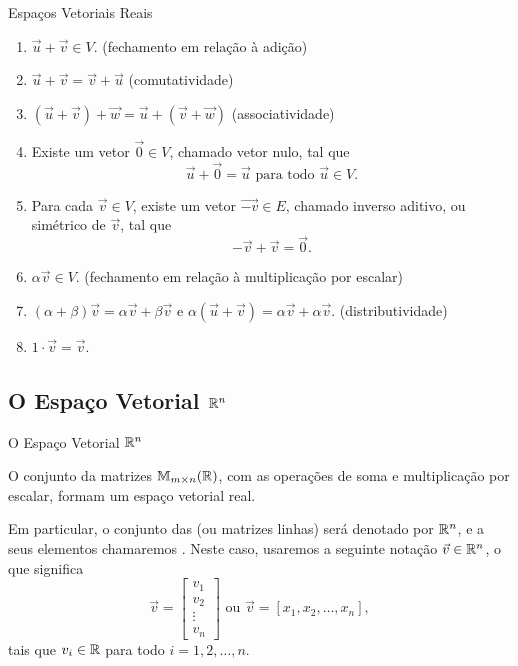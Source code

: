 \begin{frame}[label=vetores]{Espaços Vetoriais Reais}

\begin{enumerate}

\item $\vec{u}+\vec{v}\in V$. (fechamento em relação à adição)
\item $\vec{u}+\vec{v}=\vec{v}+\vec{u}$ (comutatividade)
\item $(\vec{u}+\vec{v})+\vec{w}=\vec{u}+(\vec{v}+\vec{w})$ (associatividade)
\item Existe um vetor $\vec{0}\in V$, chamado {\color{blue}vetor nulo}, tal que
\[\vec{u}+\vec{0}=\vec{u} \text{ para todo } \vec{u}\in V.\]

\item Para cada $\vec{v}\in V$, existe um vetor $\vec{-v}\in E$, chamado {\color{blue}inverso aditivo}, ou {\color{blue}simétrico} de $\vec{v}$, tal que
\[-\vec{v}+\vec{v}=\vec{0}.\]

\item $\alpha \vec{v}\in V$. (fechamento em relação à multiplicação por escalar)

\item $(\alpha+\beta)\vec{v}=\alpha \vec{v}+\beta \vec{v}$ e $\alpha(\vec{u}+\vec{v})=\alpha\vec{v}+\alpha\vec{v}$. (distributividade)

\item $1\cdot \vec{v}=\vec{v}$.
\end{enumerate}
\end{frame}



\subsection*{O Espaço Vetorial \(\mathbb{R}^n\)} \label{evreal}
\begin{frame}[label=vetores]{O Espaço Vetorial \(\mathbb{R}^n\)}

O conjunto da matrizes $\mathbb{M}_{m\times n}(\mathbb{R})$,
com as operações de soma e multiplicação por escalar, formam um {\color{blue} espaço vetorial real}.
\medskip

Em particular, o conjunto das  (ou matrizes linhas) será denotado por $\mathbb{R}^n$,
e a seus elementos chamaremos . Neste caso, usaremos a seguinte notação \(\vec{v}\in\mathbb{R}^n \), o que significa 
\[
\vec{v}=\begin{bmatrix}
v_1\\ v_2\\ \vdots\\ v_n
\end{bmatrix} \text{ ou } \vec{v}= [x_1,x_2,\ldots,x_n],
\]
tais que $v_i\in \mathbb{R}$ para todo $i=1,2,\ldots,n$.
\end{frame}


